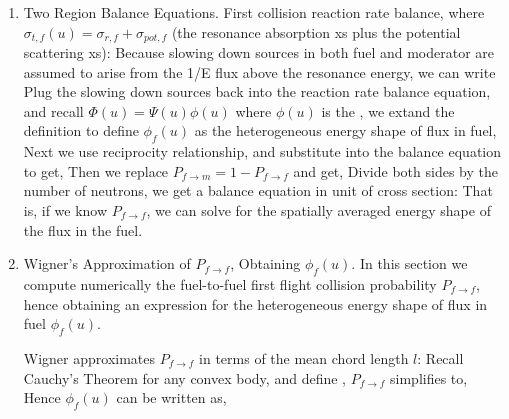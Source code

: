 \documentclass{school-22.211-notes}
\begin{document}
\begin{enumerate}
\item Two Region Balance Equations. 
First collision reaction rate balance, where $\sigma_{t,f}(u) = \sigma_{r,f} + \sigma_{pot, f}$ (the resonance absorption xs plus the potential scattering xs):
Because slowing down sources in both fuel and moderator are assumed to arise from the 1/E flux above the resonance energy, we can write
Plug the slowing down sources back into the reaction rate balance equation, and recall $\Phi(u) = \Psi(u) \phi(u)$ where $\phi(u)$ is the , we extand the definition to define $\phi_f(u)$ as the heterogeneous energy shape of flux in fuel,
Next we use reciprocity relationship,
and substitute into the balance equation to get,
Then we replace $P_{f\to m} = 1 - P_{f\to f}$ and get, 
Divide both sides by the number of neutrons, we get a balance equation in unit of cross section:
That is, if we know $P_{f\to f}$, we can solve for the spatially averaged energy shape of the flux in the fuel. 

\item Wigner's Approximation of $P_{f\to f}$, Obtaining $\phi_f(u)$.
In this section we compute numerically the fuel-to-fuel first flight collision probability $P_{f\to f}$, hence obtaining an expression for the heterogeneous energy shape of flux in fuel $\phi_f(u)$. 

Wigner approximates $P_{f\to f}$ in terms of the mean chord length $l$: 
Recall Cauchy's Theorem for any convex body, 
and define ,
$P_{f\to f}$ simplifies to, 
Hence $\phi_f(u)$ can be written as, 




\end{enumerate}
\end{document}
